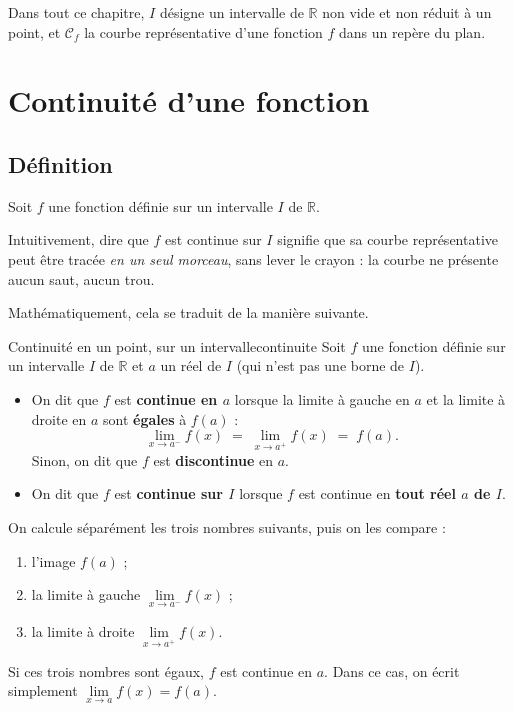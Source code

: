 \documentclass[11pt,a4paper]{article}
\newcommand{\R}{\mathbb{R}}
\newcommand{\Cf}{\mathscr{C}_f}
\newcommand{\limite}[2]{\lim\limits_{#1}#2}
\newcommand{\limg}[2]{\lim\limits_{x\to #1^-}#2}
\newcommand{\limd}[2]{\lim\limits_{x\to #1^+}#2}
\begin{document}
\begin{remarque}[Convention]
Dans tout ce chapitre, $I$ désigne un intervalle de $\R$ non vide et non réduit à
un point, et $\Cf$ la courbe représentative d'une fonction $f$ dans un repère
du plan.
\end{remarque}

\newpage
\section{Continuité d'une fonction}

\subsection{Définition}

Soit $f$ une fonction définie sur un intervalle $I$ de $\R$.

Intuitivement, dire que $f$ est continue sur $I$ signifie que sa courbe
représentative peut être tracée \emph{en un seul morceau}, sans lever le crayon :
la courbe ne présente aucun saut, aucun trou.

Mathématiquement, cela se traduit de la manière suivante.

\begin{definition}{Continuité en un point, sur un intervalle}{continuite}
Soit $f$ une fonction définie sur un intervalle $I$ de $\R$ et $a$ un réel de $I$
(qui n'est pas une borne de $I$).
\begin{itemize}
  \item On dit que $f$ est \textbf{continue en $a$} lorsque la limite à gauche
  en $a$ et la limite à droite en $a$ sont \textbf{égales} à $f(a)$ :
  \[
    \limg{a}{f(x)} \;=\; \limd{a}{f(x)} \;=\; f(a).
  \]
  Sinon, on dit que $f$ est \textbf{discontinue} en $a$.
  \item On dit que $f$ est \textbf{continue sur $I$} lorsque $f$ est continue
  en \textbf{tout réel $a$ de $I$}.
\end{itemize}
\end{definition}

\begin{remarque}
On calcule séparément les trois nombres suivants, puis on les compare :
\begin{enumerate}[label=\textcolor{bleu}{\textbf{\arabic*.}}]
  \item l'image $f(a)$ ;
  \item la limite à gauche $\limg{a}{f(x)}$ ;
  \item la limite à droite $\limd{a}{f(x)}$.
\end{enumerate}
Si ces trois nombres sont égaux, $f$ est continue en $a$. Dans ce cas, on écrit
simplement $\limite{x\to a}{f(x)}=f(a)$.
\end{remarque}
\end{document}
